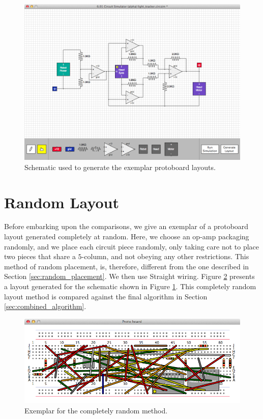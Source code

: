 \begin{figure}
\begin{center}
\includegraphics[width=\textwidth]{Images/exemplar_schematic.png}
\caption[Exemplar schematic]{Schematic used to generate the exemplar protoboard
layouts.}
\label{fig:exemplar_schematic}
\end{center}
\end{figure}

\section{Random Layout}
\label{sec:random_layout}

Before embarking upon the comparisons, we give an exemplar of a protoboard
layout generated completely at random. Here, we choose an op-amp packaging
randomly, and we place each circuit piece randomly,
only taking care not to place two pieces that share a $5$-column, and
not obeying any other restrictions. This method of random placement, is,
therefore, different from the one described in Section
\ref{sec:random_placement}. We then use Straight wiring. Figure
\ref{fig:completely_random} presents a layout generated for the schematic
shown in Figure \ref{fig:exemplar_schematic}. This completely random layout
method is compared against the final algorithm in Section
\ref{sec:combined_algorithm}.

\begin{figure}[H]
\begin{center}
\includegraphics[width=\textwidth]{Images/exemplar_completely_random.png}
\caption[Random layout exemplar]{Exemplar for the completely random method.}
\label{fig:completely_random}
\end{center}
\end{figure}

